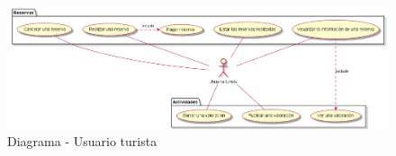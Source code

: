\begin{figure}[H]
	\centering
	\includegraphics[width=1\linewidth]{5-AnalisisDelSistemaDeInformacion//Casos de uso//usuarioTurista/diagrama.png}
	\caption{Diagrama - Usuario turista}
\end{figure}